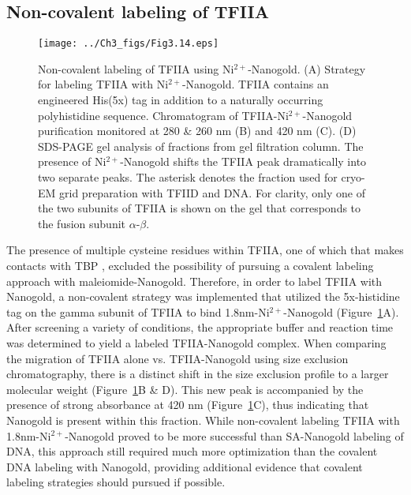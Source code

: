 \subsection{Non-covalent labeling of TFIIA}
\begin{figure}
\centering
\texttt{[image: ../Ch3\_figs/Fig3.14.eps]}
\caption[Non-covalent labeling of TFIIA using Ni$^{2+}$-Nanogold]{Non-covalent labeling of TFIIA using Ni$^{2+}$-Nanogold. (A) Strategy for labeling TFIIA with Ni$^{2+}$-Nanogold. TFIIA contains an engineered His(5x) tag in addition to a naturally occurring polyhistidine sequence. Chromatogram of TFIIA-Ni$^{2+}$-Nanogold purification monitored at 280 \& 260 nm (B) and 420 nm (C). (D) SDS-PAGE gel analysis of fractions from gel filtration column. The presence of Ni$^{2+}$-Nanogold shifts the TFIIA peak dramatically into two separate peaks. The asterisk denotes the fraction used for cryo-EM grid preparation with TFIID and DNA. For clarity, only one of the two subunits of TFIIA is shown on the gel that corresponds to the fusion subunit $\alpha$-$\beta$.}
\label{fig:Fig3.14}
\end{figure}
\indent The presence of multiple cysteine residues within TFIIA, one of which that makes contacts with TBP \cite{Bleichenbacher_2003}, excluded the possibility of pursuing a covalent labeling approach with maleiomide-Nanogold.  Therefore, in order to label TFIIA with Nanogold, a non-covalent strategy was implemented that utilized the 5x-histidine tag on the gamma subunit of TFIIA to bind 1.8nm-Ni$^{2+}$-Nanogold (Figure~\ref{fig:Fig3.14}A). After screening a variety of conditions, the appropriate buffer and reaction time was determined to yield a labeled TFIIA-Nanogold complex. When comparing the migration of TFIIA alone vs. TFIIA-Nanogold using size exclusion chromatography, there is a distinct shift in the size exclusion profile to a larger molecular weight (Figure~\ref{fig:Fig3.14}B \& D). This new peak is accompanied by the presence of strong absorbance at 420 nm (Figure~\ref{fig:Fig3.14}C), thus indicating that Nanogold is present within this fraction. While non-covalent labeling TFIIA with 1.8nm-Ni$^{2+}$-Nanogold proved to be more successful than SA-Nanogold labeling of DNA, this approach still required much more optimization than the covalent DNA labeling with Nanogold, providing additional evidence that covalent labeling strategies should pursued if possible.  \\

